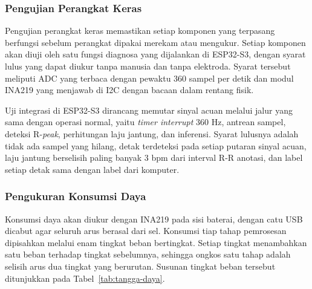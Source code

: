 \subsubsection{Pengujian Perangkat Keras}

Pengujian perangkat keras memastikan setiap komponen yang terpasang berfungsi sebelum perangkat dipakai merekam atau mengukur. Setiap komponen akan diuji oleh satu fungsi diagnosa yang dijalankan di ESP32-S3, dengan syarat lulus yang dapat diukur tanpa manusia dan tanpa elektroda. Syarat tersebut meliputi ADC yang terbaca dengan pewaktu 360 sampel per detik dan modul INA219 yang menjawab di I2C dengan bacaan dalam rentang fisik.

Uji integrasi di ESP32-S3 dirancang memutar sinyal acuan melalui jalur yang sama dengan operasi normal, yaitu \textit{timer interrupt} 360 Hz, antrean sampel, deteksi R-\textit{peak}, perhitungan laju jantung, dan inferensi. Syarat lulusnya adalah tidak ada sampel yang hilang, detak terdeteksi pada setiap putaran sinyal acuan, laju jantung berselisih paling banyak 3 bpm dari interval R-R anotasi, dan label setiap detak sama dengan label dari komputer.

\subsubsection{Pengukuran Konsumsi Daya}

Konsumsi daya akan diukur dengan INA219 pada sisi baterai, dengan catu USB dicabut agar seluruh arus berasal dari sel. Konsumsi tiap tahap pemrosesan dipisahkan melalui enam tingkat beban bertingkat. Setiap tingkat menambahkan satu beban terhadap tingkat sebelumnya, sehingga ongkos satu tahap adalah selisih arus dua tingkat yang berurutan. Susunan tingkat beban tersebut ditunjukkan pada Tabel~\ref{tab:tangga-daya}.

